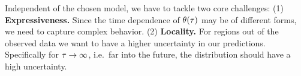 Independent of the chosen model, we have to tackle two core challenges: (1) \textbf{Expressiveness.} Since the time dependence of $\theta(\tau)$ may be of different forms, we need to capture complex behavior. (2) \textbf{Locality.} For regions out of the observed data we want to have a higher uncertainty in our predictions. Specifically for $\tau \rightarrow \infty$, i.e.\  far into the future, the distribution should have a high uncertainty.








%


